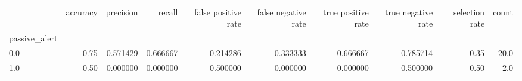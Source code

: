 \begin{tabular}{lrrrrrrrrr}
\toprule
{} &  accuracy &  precision &    recall &  false positive rate &  false negative rate &  true positive rate &  true negative rate &  selection rate &  count \\
passive\_alert &           &            &           &                      &                      &                     &                     &                 &        \\
\midrule
0.0           &      0.75 &   0.571429 &  0.666667 &             0.214286 &             0.333333 &            0.666667 &            0.785714 &            0.35 &   20.0 \\
1.0           &      0.50 &   0.000000 &  0.000000 &             0.500000 &             0.000000 &            0.000000 &            0.500000 &            0.50 &    2.0 \\
\bottomrule
\end{tabular}
